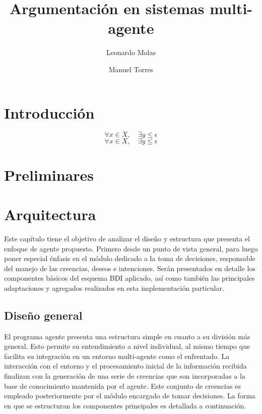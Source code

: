 \documentclass[oneside]{book}
\title{Argumentación en sistemas multi-agente} %
\author{Leonardo Molas \and Manuel Torres}
\theoremstyle{definition}
\theoremstyle{example}
\begin{document}
\maketitle
\tableofcontents

\chapter*{Introducción}


$$ \forall x \in X, \mbox{$\quad$} \exists y \leq \epsilon $$
$$ \forall x \in X, \quad \exists y \leq \epsilon $$


\chapter{Preliminares} 





%


\chapter{Arquitectura} %

Este capítulo tiene el objetivo de analizar el diseño y estructura que presenta el 
enfoque de agente propuesto. Primero desde un punto de vista general, para luego 
poner especial énfasis en el módulo dedicado a la toma de decisiones, responsable 
del manejo de las creencias, deseos e intenciones. Serán presentados en detalle los 
componentes básicos del esquema BDI aplicado, así como también las principales 
adaptaciones y agregados realizados en esta implementación particular.

\section{Diseño general}


El programa agente presenta una estructura simple en cuanto a su división más general. 
Esto permite su entendimiento a nivel individual, al mismo tiempo que facilita su 
integración en un entorno multi-agente como el enfrentado. La interacción con el entorno 
y el procesamiento inicial de la información recibida finalizan con la generación de una 
serie de creencias que son incorporadas a la base de conocimiento mantenida por el agente. 
Este conjunto de creencias es empleado posteriormente por el módulo encargado de tomar 
decisiones. La forma en que se estructuran los componentes principales es detallada a 
continuación.
\end{document}

